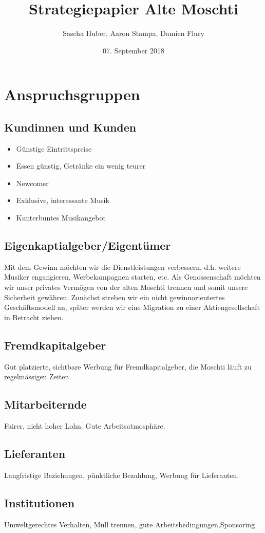 \documentclass[a4paper, titlepage]{article}
\title{Strategiepapier Alte Moschti}
\author{Sascha Huber, Aaron Stampa, Damien Flury}
\date{07. September 2018}
\begin{document}
\maketitle

\tableofcontents
\newpage

\section{Anspruchsgruppen}
\subsection{Kundinnen und Kunden}
\begin{itemize}
  \item Günstige Eintrittspreise
  \item Essen günstig, Getränke ein wenig teurer
  \item Newcomer
  \item Exklusive, interessante Musik
  \item Kunterbuntes Musikangebot
\end{itemize}
\subsection{Eigenkaptialgeber/Eigentümer}
Mit dem Gewinn möchten wir die Dienstleistungen verbessern, d.h. weitere Musiker engangieren,
Werbekampagnen starten, etc. Als Genossenschaft möchten wir unser privates Vermögen von der
alten Moschti trennen und somit unsere Sicherheit gewähren. Zunächst streben wir ein nicht gewinnorientertes
Geschäftsmodell an, später werden wir eine Migration zu einer Aktiengesellschaft in Betracht ziehen.
\subsection{Fremdkapitalgeber}
Gut platzierte, sichtbare Werbung für Fremdkapitalgeber, die Moschti läuft zu regelmässigen Zeiten.
\subsection{Mitarbeiternde}
Fairer, nicht hoher Lohn. Gute Arbeitsatmosphäre.
\subsection{Lieferanten}
Langfristige Beziehungen, pünktliche Bezahlung, Werbung für Lieferanten.
\subsection{Institutionen}
Umweltgerechtes Verhalten, Müll trennen, gute Arbeitsbedingungen,Sponsoring
\end{document}
